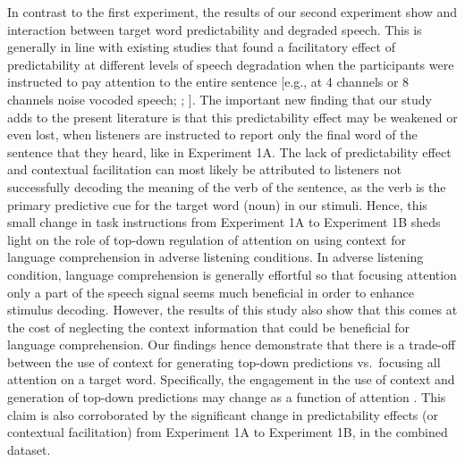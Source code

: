 \documentclass[a4paper, nobind]{templates/ociamthesis}
\begin{document}
In contrast to the first experiment, the results of our second experiment show and interaction between target word predictability and degraded speech.
This is generally in line with existing studies that found a facilitatory effect of predictability at different levels of speech degradation when the participants were instructed to pay attention to the entire sentence {[}e.g., at 4 channels or 8 channels noise vocoded speech; \textcite{Obleser2007}; \textcite{Obleser2010}{]}.
The important new finding that our study adds to the present literature is that this predictability effect may be weakened or even lost, when listeners are instructed to report only the final word of the sentence that they heard, like in Experiment 1A.
The lack of predictability effect and contextual facilitation can most likely be attributed to listeners not successfully decoding the meaning of the verb of the sentence, as the verb is the primary predictive cue for the target word (noun) in our stimuli.
Hence, this small change in task instructions from Experiment 1A to Experiment 1B sheds light on the role of top-down regulation of attention on using context for language comprehension in adverse listening conditions.
In adverse listening condition, language comprehension is generally effortful so that focusing attention only a part of the speech signal seems much beneficial in order to enhance stimulus decoding.
However, the results of this study also show that this comes at the cost of neglecting the context information that could be beneficial for language comprehension.
Our findings hence demonstrate that there is a trade-off between the use of context for generating top-down predictions vs.~focusing all attention on a target word.
Specifically, the engagement in the use of context and generation of top-down predictions may change as a function of attention \autocite[see also][]{Li2014}.
This claim is also corroborated by the significant change in predictability effects (or contextual facilitation) from Experiment 1A to Experiment 1B, in the combined dataset.
\end{document}
